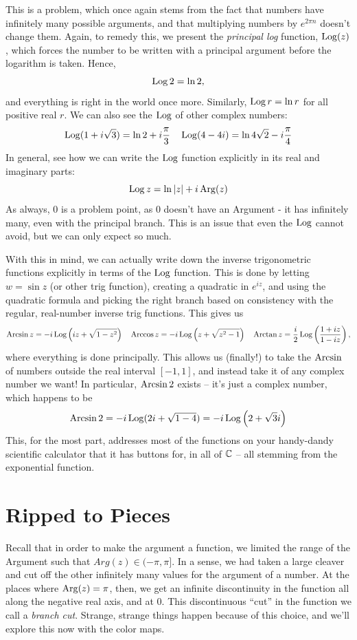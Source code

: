 \documentclass[12pt]{scrartcl}
\begin{document}
This is a problem, which once again stems from the fact that numbers have infinitely many possible arguments, and that multiplying numbers by $e^{2\pi n}$ doesn't change them. Again, to remedy this, we present the \textit{principal log} function, $\operatorname*{Log} (z)$, which forces the number to be written with a principal argument before the logarithm is taken. Hence,
\[
	\operatorname*{Log} 2 = \ln 2,
\]
and everything is right in the world once more. Similarly, $\operatorname*{Log} r = \ln r$ for all positive real $r$. We can also see the $\operatorname*{Log}$ of other complex numbers:
\[
	\operatorname*{Log} (1 + i \sqrt{3}) = \ln 2 + i \frac{\pi}{3} \quad \operatorname*{Log}(4  - 4i) = \ln 4 \sqrt{2} - i \frac{\pi}{4}
\]
In general, see how we can write the $\operatorname*{Log}$ function explicitly in its real and imaginary parts:
\[
	\operatorname*{Log} z = \ln |z| + i \operatorname*{Arg}(z)
\]
As always, 0 is a problem point, as 0 doesn't have an Argument - it has infinitely many, even with the principal branch. This is an issue that even the $\operatorname*{Log}$ cannot avoid, but we can only expect so much.

With this in mind, we can actually write down the inverse trigonometric functions explicitly in terms of the $\operatorname*{Log}$ function. This is done by letting $w = \sin z$ (or other trig function), creating a quadratic in $e^{iz}$, and using the quadratic formula and picking the right branch based on consistency with the regular, real-number inverse trig functions. This gives us
\[
	\operatorname{Arcsin} z = -i \operatorname*{Log}\left(iz + \sqrt{1-z^2}\right) \quad \operatorname{Arccos} z = -i \operatorname*{Log}\left(z + \sqrt{z^2 -1}\right) \quad \operatorname{Arctan} z = \frac{i}{2} \operatorname*{Log}\left( \frac{1+iz}{1-iz}\right),
\]
where everything is done principally. This allows us (finally!) to take the $\operatorname{Arcsin}$ of numbers outside the real interval $[-1, 1]$, and instead take it of any complex number we want! In particular, $\operatorname{Arcsin} 2$ exists -- it's just a complex number, which happens to be
\[
	\operatorname{Arcsin} 2 = -i \operatorname*{Log}(2i + \sqrt{1-4}) = -i \operatorname*{Log}\left(2+\sqrt{3}i\right)
\]
This, for the most part, addresses most of the functions on your handy-dandy scientific calculator that it has buttons for, in all of $\mathbb C$ -- all stemming from the exponential function.
\section{Ripped to Pieces}

Recall that in order to make the argument a function, we limited the range of the Argument such that $Arg(z) \in (-\pi, \pi]$. In a sense, we had taken a large cleaver and cut off the other infinitely many values for the argument of a number. At the places where $\operatorname*{Arg}(z) = \pi$, then, we get an infinite discontinuity in the function all along the negative real axis, and at 0. This discontinuous ``cut'' in the function we call a \textit{branch cut}. Strange, strange things happen because of this choice, and we'll explore this now with the color maps.
\end{document}
